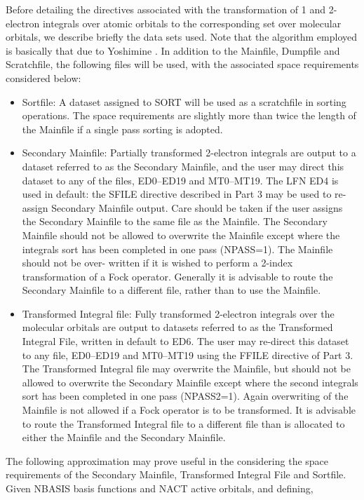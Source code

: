 \documentclass[11pt,fleqn]{article}
\begin{document}
Before detailing the directives associated with
the transformation of 1 and 2-electron integrals
over atomic orbitals to the corresponding set over molecular
orbitals, we describe briefly the data sets
used. Note that the algorithm employed is basically that due to
Yoshimine  \cite{ref:40}.
In addition to the Mainfile, Dumpfile and Scratchfile,
the following files will be used, with the associated space
requirements considered below:
\begin{itemize}
\item Sortfile: A dataset assigned to SORT will be used as a 
scratchfile in sorting operations. The
space requirements are slightly more than twice the length of the
Mainfile if a single pass sorting is adopted. 
\item Secondary Mainfile: Partially transformed 2-electron 
integrals are output to a dataset referred to 
as the Secondary Mainfile, and the user
may direct this dataset to any of the files, ED0--ED19 and MT0--MT19.
The LFN ED4 is used in default: the SFILE directive described in 
Part 3 may be used to re-assign Secondary Mainfile output.  Care
should be taken if the user assigns the Secondary Mainfile to the same
file as the Mainfile. The Secondary Mainfile should not be
allowed to overwrite the Mainfile except where the integrals sort has
been completed in one pass (NPASS=1). The Mainfile should not be over-
written if it is wished to perform a 2-index transformation of a Fock
operator. Generally it is advisable to route the Secondary Mainfile
to a different file, rather than to use the Mainfile.
\item  Transformed Integral file: Fully transformed 2-electron 
integrals over the molecular orbitals are output to datasets 
referred to as the Transformed Integral File, written in default to ED6.
The user may re-direct this dataset to any file, ED0--ED19 
and MT0--MT19 using the FFILE directive of Part 3.
The Transformed Integral file 
may overwrite the Mainfile, but
should not be allowed to overwrite the Secondary Mainfile except where
the second integrals sort has been completed in one pass (NPASS2=1).
Again overwriting of the Mainfile is not allowed if a Fock operator is
to be transformed. It is advisable to 
route the Transformed Integral file to a
different file than is allocated to either the Mainfile and the
Secondary Mainfile.
\end{itemize} 
The following approximation may prove useful in the considering the
space requirements of the Secondary Mainfile, Transformed Integral 
File and Sortfile. Given NBASIS basis functions and NACT active
orbitals, and defining,
\end{document}
